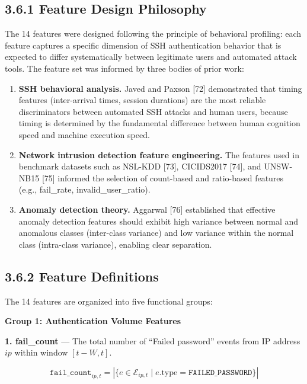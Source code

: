 \documentclass[
  a4paper]{report}
\begin{document}
\subsection{3.6.1 Feature Design
Philosophy}\label{feature-design-philosophy}

The 14 features were designed following the principle of behavioral
profiling: each feature captures a specific dimension of SSH
authentication behavior that is expected to differ systematically
between legitimate users and automated attack tools. The feature set was
informed by three bodies of prior work:

\begin{enumerate}
\def\labelenumi{\arabic{enumi}.}
\item
  \textbf{SSH behavioral analysis.} Javed and Paxson {[}72{]}
  demonstrated that timing features (inter-arrival times, session
  durations) are the most reliable discriminators between automated SSH
  attacks and human users, because timing is determined by the
  fundamental difference between human cognition speed and machine
  execution speed.
\item
  \textbf{Network intrusion detection feature engineering.} The features
  used in benchmark datasets such as NSL-KDD {[}73{]}, CICIDS2017
  {[}74{]}, and UNSW-NB15 {[}75{]} informed the selection of count-based
  and ratio-based features (e.g., fail\_rate, invalid\_user\_ratio).
\item
  \textbf{Anomaly detection theory.} Aggarwal {[}76{]} established that
  effective anomaly detection features should exhibit high variance
  between normal and anomalous classes (inter-class variance) and low
  variance within the normal class (intra-class variance), enabling
  clear separation.
\end{enumerate}

\subsection{3.6.2 Feature Definitions}\label{feature-definitions}

The 14 features are organized into five functional groups:

\textbf{Group 1: Authentication Volume Features}

\textbf{1. fail\_count} --- The total number of ``Failed password''
events from IP address \(ip\) within window \([t-W, t]\).

\[\texttt{fail\_count}_{ip,t} = |\{e \in \mathcal{E}_{ip,t} \mid e.\text{type} = \texttt{FAILED\_PASSWORD}\}|\]
\end{document}
